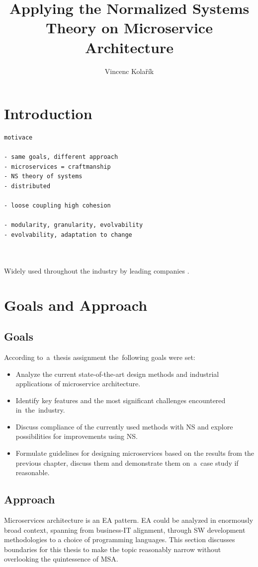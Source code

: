 \documentclass[thesis=M,english,hidelinks]{FITthesis}[2012/10/20]
\title{Applying the Normalized Systems Theory on Microservice Architecture}
\author{Vincenc Kolařík} %
\begin{document}
% 
% 
\chapter{Introduction}
\begin{verbatim}
motivace

- same goals, different approach
- microservices = craftmanship
- NS theory of systems
- distributed 
    
- loose coupling high cohesion

- modularity, granularity, evolvability
- evolvability, adaptation to change

    
\end{verbatim}

Widely used throughout the industry by leading companies \cite{ms-who-is-using}.


% 
% 
\chapter{Goals and Approach}
\section{Goals}
According to~a~thesis assignment the~following goals were set:
\begin{itemize}
	\item Analyze the current state-of-the-art design methods and industrial applications of microservice architecture.
	\item Identify key features and the most significant challenges encountered in~the~industry.
	\item Discuss compliance of the currently used methods with \acrlong{NS} and explore possibilities for improvements using \acrshort{NS}. 
	\item Formulate guidelines for designing microservices based on the results from the previous chapter, discuss them and demonstrate them on~a~case study if reasonable.
\end{itemize}

\section{Approach}
Microservices architecture is an \acrfull{EA} pattern. \acrshort{EA} could be analyzed in enormously broad context, spanning from business-IT alignment, through \acrshort{SW} development methodologies to a choice of programming languages. This section discusses boundaries for this thesis to make the topic reasonably narrow without overlooking the quintessence of \acrlong{MSA}.
\end{document}
